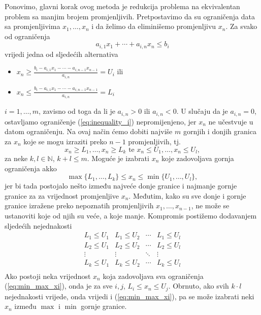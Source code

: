 \documentclass[a4paper, utf8, 11pt, colorlinks]{book}
\theoremstyle{definition}
\begin{document}
 Ponovimo, glavni korak ovog metoda je redukcija problema na ekvivalentan problem sa manjim brojem promjenljivih. Pretpostavimo da su ograničenja data sa promjenljivima $x_1,\ldots, x_n$ i da želimo da eliminišemo promjenljivu $x_n$. Za svako od ograničenja
 \begin{equation}\label{eq:inequality_i}
      a_{i,1} x_1 + \cdots + a_{i,n} x_n \leq b_i
 \end{equation}
 vrijedi jedna od sljedećih alternativa 
 \begin{itemize}
 	 \item  $x_n \geq \frac{b_i - a_{i,1}x_1- \cdots - a_{i, n-1} x_{n-1} }{a_{i,n}}=U_i$ ili 
 	 \item   $x_n \leq \frac{b_i - a_{i,1}x_1- \cdots - a_{i, n-1} x_{n-1} }{a_{i,n}}=L_i$
 \end{itemize}
 $i=1,\ldots, m$, zavisno od toga da li je $a_{i,n} >0$ ili $a_{i,n} <0$. U slučaju da je $a_{i,n} = 0$,  ostavljamo  ograničenje (\ref{eq:inequality_i}) nepromijenjeno, jer   $x_n$  ne učestvuje u datom ograničenju. Na ovaj način ćemo dobiti najviše $m$ gornjih i donjih granica za $x_n$ koje se mogu izraziti preko $n-1$ promjenljivih, tj. 
 $$  x_n \geq L_1, \ldots, x_n\geq L_k \mbox{ te }  x_n \leq U_1, \ldots, x_n \leq U_l,$$
  za neke $k,l \in \mathbb{N}$, $k+l \leq m$.
 Moguće je izabrati $x_n$ koje zadovoljava gornja ograničenja akko 
 \begin{equation}\label{eq:min_max_xi}
     \max\{L_1,\ldots, L_k \} \leq x_n \leq \min \{ U_1, \ldots, U_l \},
   \end{equation}
 jer bi tada postojalo nešto između najveće donje granice i najmanje gornje granice za za vrijednost promjenljive $x_n$. Međutim, kako su sve donje i gornje granice izražene preko nepoznatih promjenljivih $x_1, \ldots, x_{n-1}$, ne može se ustanoviti koje od njih su veće, a koje manje. Kompromis postižemo dodavanjem  sljedećih nejednakosti 
 $$\begin{array}{cccc}
       L_1 \leq U_1 & L_1 \leq U_2   &  \cdots   & L_1 \leq U_l \\
       L_2 \leq U_1 & L_2  \leq U_2  &  \cdots   & L_2 \leq U_l \\
       \vdots       &     \vdots     &   \ddots  & \vdots       \\
       L_k \leq U_1 &  L_k \leq U_2  &   \cdots  & L_k \leq U_l \\
 \end{array}$$ 
Ako postoji neka vrijednost  $x_n$ koja zadovoljava sva ograničenja (\ref{eq:min_max_xi}), onda je za sve $i,j$, 
$L_i \leq x_n \leq U_j$. Obrnuto, ako svih $k \cdot l$ nejednakosti vrijede, onda vrijedi i (\ref{eq:min_max_xi}), pa se može izabrati neki $x_n$ između $\max$ i $\min$ gornje granice. 
\end{document}
